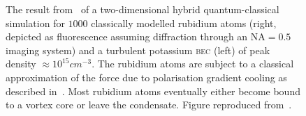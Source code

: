 \begin{figure}
\centering
\noindent{}
\noindent{}
\noindent{}
\caption{The result from~\cite{billington_particle_2010} of a two-dimensional hybrid quantum-classical simulation for $1000$ classically modelled rubidium atoms (right, depicted as fluorescence assuming diffraction through an $\mathrm{NA}=0.5$ imaging system) and a turbulent potassium \textsc{bec} (left) of peak density $\approx 10^{15}\unit{cm}^{-3}$. The rubidium atoms are subject to a classical approximation of the force due to polarisation gradient cooling as described in~\cite{billington_particle_2010}. Most rubidium atoms eventually either become bound to a vortex core or leave the condensate. Figure reproduced from~\cite{billington_particle_2010}.}%
\label{fig:hybrid}%
\end{figure}

